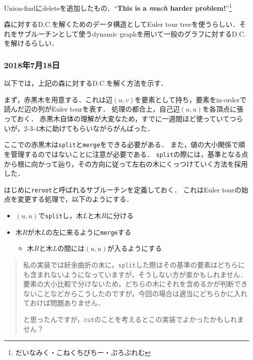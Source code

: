 \documentclass[a4paper]{jsarticle}
\begin{document}
Union-findにdeleteを追加したもの．{``}\textbf{This is a \textit{much} harder problem!}{''}\footnote{だいなみく・こねくちびちー・ぷろぶれむ}

森に対するD.C.を解くためのデータ構造としてEuler tour treeを使うらしい．それをサブルーチンとして使うdynamic graphを用いて一般のグラフに対するD.C.を解けるらしい．

\subsubsection{2018年7月18日}
以下では，上記の森に対するD.C.を解く方法を示す．

まず，赤黒木を用意する．これは辺$(u, v)$を要素として持ち，要素をin-orderで読んだ辺の列がEuler tourを表す．
処理の都合上，自己辺$(u, u)$を各頂点に張っておく．
赤黒木自体の理解が大変なため，すでに一週間ほど使っていてつらいが，2-3-4木に助けてもらいながらがんばった．

ここでの赤黒木は\texttt{split}と\texttt{merge}をできる必要がある．
また，値の大小関係で順を管理するのではないことに注意が必要である．
\texttt{split}の際には，基準となる点から根に向かって辿り，その方向に従って左右の木にくっつけていく方法を採用した．

はじめに\texttt{reroot}と呼ばれるサブルーチンを定義しておく．
これはEuler tourの始点を変更する処理で，以下のようにする．
\begin{itemize}
\item $(u, u)$で\texttt{split}し，木$L$と木$R$に分ける
\item 木$R$が木$L$の左に来るように\texttt{merge}する
  \begin{itemize}
  \item 木$R$と木$L$の間には$(u, u)$が入るようにする
  \end{itemize}
\end{itemize}
\begin{quote}
私の実装では紆余曲折の末に，\texttt{split}した際はその基準の要素はどちらにも含まれないようになっていますが，そうしない方が楽かもしれません．
要素の大小比較で分けないため，どちらの木にそれを含めるかが判断できないことなどからこうしたのですが，今回の場合は適当にどちらかに入れておけば問題ありません．

と思ったんですが，\texttt{cut}のことを考えるとこの実装でよかったかもしれません？
\end{quote}
\end{document}

